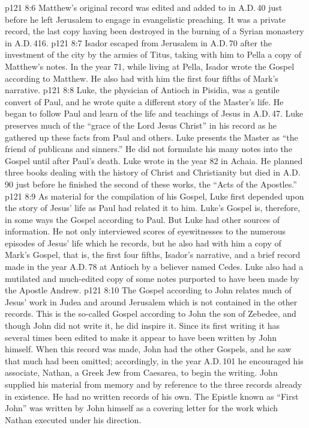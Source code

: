 \vs p121 8:6 Matthew’s original record was edited and added to in A.D.\,40 just before he left Jerusalem to engage in evangelistic preaching. It was a private record, the last copy having been destroyed in the burning of a Syrian monastery in A.D.\,416.
\vs p121 8:7 Isador escaped from Jerusalem in A.D.\,70 after the investment of the city by the armies of Titus, taking with him to Pella a copy of Matthew’s notes. In the year 71, while living at Pella, Isador wrote the Gospel according to Matthew. He also had with him the first four fifths of Mark’s narrative.
\vs p121 8:8 \bibnobreakspace {} Luke, the physician of Antioch in Pisidia, was a gentile convert of Paul, and he wrote quite a different story of the Master’s life. He began to follow Paul and learn of the life and teachings of Jesus in A.D.\,47. Luke preserves much of the “grace of the Lord Jesus Christ” in his record as he gathered up these facts from Paul and others. Luke presents the Master as “the friend of publicans and sinners.” He did not formulate his many notes into the Gospel until after Paul’s death. Luke wrote in the year 82 in Achaia. He planned three books dealing with the history of Christ and Christianity but died in A.D.\,90 just before he finished the second of these works, the “Acts of the Apostles.”
\vs p121 8:9 As material for the compilation of his Gospel, Luke first depended upon the story of Jesus’ life as Paul had related it to him. Luke’s Gospel is, therefore, in some ways the Gospel according to Paul. But Luke had other sources of information. He not only interviewed scores of eyewitnesses to the numerous episodes of Jesus’ life which he records, but he also had with him a copy of Mark’s Gospel, that is, the first four fifths, Isador’s narrative, and a brief record made in the year A.D.\,78 at Antioch by a believer named Cedes. Luke also had a mutilated and much\hyp{}edited copy of some notes purported to have been made by the Apostle Andrew.
\vs p121 8:10 \bibnobreakspace {} The Gospel according to John relates much of Jesus’ work in Judea and around Jerusalem which is not contained in the other records. This is the so\hyp{}called Gospel according to John the son of Zebedee, and though John did not write it, he did inspire it. Since its first writing it has several times been edited to make it appear to have been written by John himself. When this record was made, John had the other Gospels, and he saw that much had been omitted; accordingly, in the year A.D.\,101 he encouraged his associate, Nathan, a Greek Jew from Caesarea, to begin the writing. John supplied his material from memory and by reference to the three records already in existence. He had no written records of his own. The Epistle known as “First John” was written by John himself as a covering letter for the work which Nathan executed under his direction.
